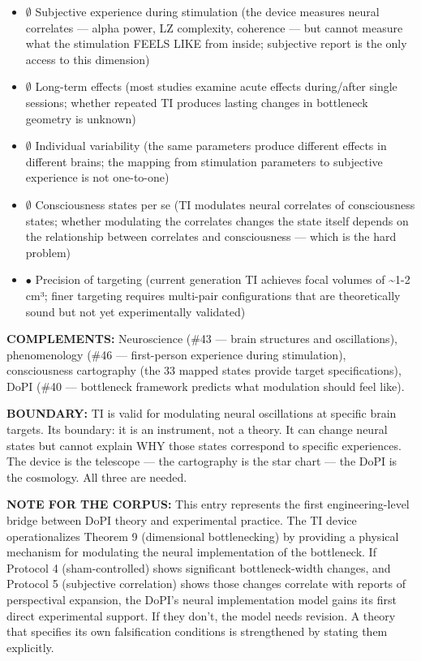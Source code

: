 \begin{itemize}[nosep,leftmargin=*]
  \item $\emptyset$ Subjective experience during stimulation (the device measures neural correlates — alpha power, LZ complexity, coherence — but cannot measure what the stimulation FEELS LIKE from inside; subjective report is the only access to this dimension)
  \item $\emptyset$ Long-term effects (most studies examine acute effects during/after single sessions; whether repeated TI produces lasting changes in bottleneck geometry is unknown)
  \item $\emptyset$ Individual variability (the same parameters produce different effects in different brains; the mapping from stimulation parameters to subjective experience is not one-to-one)
  \item $\emptyset$ Consciousness states per se (TI modulates neural correlates of consciousness states; whether modulating the correlates changes the state itself depends on the relationship between correlates and consciousness — which is the hard problem)
  \item $\bullet$ Precision of targeting (current generation TI achieves focal volumes of \textasciitilde{}1-2 cm³; finer targeting requires multi-pair configurations that are theoretically sound but not yet experimentally validated)
\end{itemize}


\textbf{COMPLEMENTS:} Neuroscience (\#43 — brain structures and oscillations), phenomenology (\#46 — first-person experience during stimulation), consciousness cartography (the 33 mapped states provide target specifications), DoPI (\#40 — bottleneck framework predicts what modulation should feel like).


\textbf{BOUNDARY:} TI is valid for modulating neural oscillations at specific brain targets. Its boundary: it is an instrument, not a theory. It can change neural states but cannot explain WHY those states correspond to specific experiences. The device is the telescope — the cartography is the star chart — the DoPI is the cosmology. All three are needed.


\textbf{NOTE FOR THE CORPUS:} This entry represents the first engineering-level bridge between DoPI theory and experimental practice. The TI device operationalizes Theorem 9 (dimensional bottlenecking) by providing a physical mechanism for modulating the neural implementation of the bottleneck. If Protocol 4 (sham-controlled) shows significant bottleneck-width changes, and Protocol 5 (subjective correlation) shows those changes correlate with reports of perspectival expansion, the DoPI's neural implementation model gains its first direct experimental support. If they don't, the model needs revision. A theory that specifies its own falsification conditions is strengthened by stating them explicitly.


